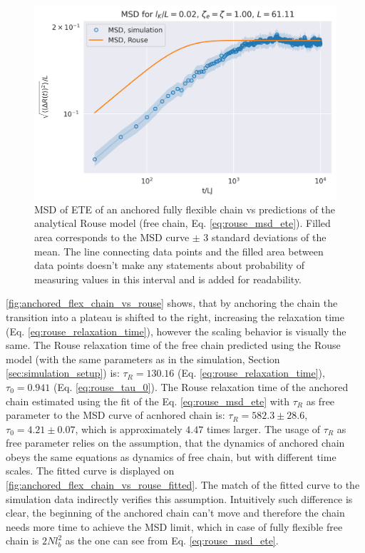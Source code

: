 \documentclass[
    paper=A4,pagesize=automedia,fontsize=12pt,
    BCOR=15mm,DIV=22,
    twoside,headinclude,footinclude=false,
    fleqn,             %
    bibliography=totocnumbered,          %
    listof=totoc,                %
    listof=flat,                 %
    cleardoublepage=empty      %
    numbers=endperiod
]{scrartcl}
\begin{document}
\begin{figure}[h]
    \begin{center}
      \includegraphics[width=\columnwidth,trim={0cm 0cm 0cm 0.9cm},clip]{3-exp-fixed-param-log.png}
      \caption{\label{fig:anchored_flex_chain_vs_rouse}
      MSD of ETE of an anchored fully flexible chain vs predictions of
      the analytical Rouse model (free chain, Eq. \ref{eq:rouse_msd_ete}).
      Filled area corresponds to the MSD curve $\pm$ 3 standard deviations of the mean. 
      The
      line connecting data points and the filled area between data points doesn't make
      any statements about probability of measuring values in this interval and is
      added for readability.
      }
    \end{center}
\end{figure}

\autoref{fig:anchored_flex_chain_vs_rouse} shows, that by anchoring the chain
the transition into a plateau is shifted to the right, increasing the 
relaxation time (Eq. \ref{eq:rouse_relaxation_time}), 
however the scaling behavior is visually the same. The Rouse relaxation time
of the free chain predicted using the Rouse model 
(with the same parameters as in the simulation, Section \ref{sec:simulation_setup})
is: $\tau_R=130.16$ (Eq. \ref{eq:rouse_relaxation_time}), 
$\tau_0=0.941$ (Eq. \ref{eq:rouse_tau_0}). 
The Rouse relaxation time of the anchored chain estimated 
using the fit of the Eq. \ref{eq:rouse_msd_ete} with $\tau_R$ as free parameter
to the MSD curve of acnhored chain is: 
$\tau_R=582.3 \pm 28.6$, $\tau_0=4.21 \pm 0.07$, which is approximately $4.47$ times
larger. The usage of $\tau_R$ as free parameter relies on the assumption, that
the dynamics of anchored chain obeys the same equations as dynamics of free chain, 
but with different time scales. The fitted curve is displayed on
\autoref{fig:anchored_flex_chain_vs_rouse_fitted}. The match of 
the fitted curve to the simulation data indirectly verifies this assumption.
Intuitively such difference is clear, the beginning of the anchored chain
can't move and therefore the chain needs more time to achieve the MSD limit, which
in case of fully flexible free chain is $2Nl_b^2$ as the one can see from Eq. \ref{eq:rouse_msd_ete}. 
\end{document}
